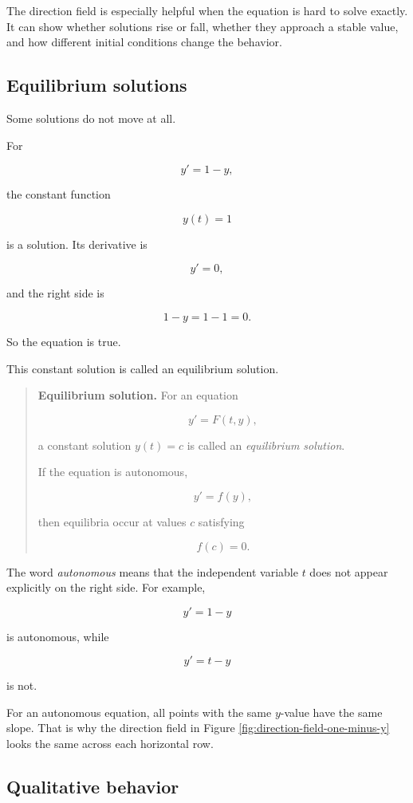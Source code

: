 The direction field is especially helpful when the equation is hard to solve exactly.  It
can show whether solutions rise or fall, whether they approach a stable value, and how
different initial conditions change the behavior.

\subsection{Equilibrium solutions}
\label{subsec:equilibrium-solutions}

Some solutions do not move at all.

For

\[
y'=1-y,
\]

the constant function

\[
y(t)=1
\]

is a solution.  Its derivative is

\[
y'=0,
\]

and the right side is

\[
1-y=1-1=0.
\]

So the equation is true.

This constant solution is called an equilibrium solution.

\begin{quote}
\textbf{Equilibrium solution.}
For an equation

\[
y'=F(t,y),
\]

a constant solution \(y(t)=c\) is called an \emph{equilibrium solution}.

If the equation is autonomous,

\[
y'=f(y),
\]

then equilibria occur at values \(c\) satisfying

\[
f(c)=0.
\]
\end{quote}

The word \emph{autonomous} means that the independent variable \(t\) does not appear
explicitly on the right side.  For example,

\[
y'=1-y
\]

is autonomous, while

\[
y'=t-y
\]

is not.

For an autonomous equation, all points with the same \(y\)-value have the same slope.
That is why the direction field in Figure \ref{fig:direction-field-one-minus-y} looks the
same across each horizontal row.

\subsection{Qualitative behavior}
\label{subsec:qualitative-behavior-direction-fields}

